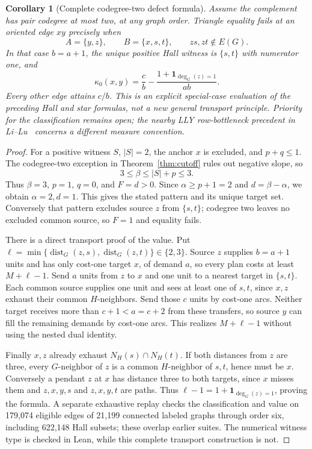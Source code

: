 \documentclass[11pt]{article}
\newtheorem{corollary}[theorem]{Corollary}
\theoremstyle{remark}
\newcommand{\dist}{\operatorname{dist}}
\begin{document}
\begin{corollary}[Complete codegree-two defect formula]\label{cor:k2}
Assume the complement has pair codegree at most two, at any graph order. Triangle equality fails at an oriented edge $xy$ precisely when
\[
 A=\{y,z\},\qquad B=\{x,s,t\},\qquad zs,zt\notin E(G).
\]
In that case $b=a+1$, the unique positive Hall witness is $\{s,t\}$ with numerator one, and
\[
 \kappa_0(x,y)=\frac cb-\frac{1+\boldsymbol1_{\deg_G(z)=1}}{ab}.
\]
Every other edge attains $c/b$. This is an explicit special-case evaluation of the preceding Hall and star formulas, not a new general transport principle. Priority for the classification remains open; the nearby LLY row-bottleneck precedent in Li--Lu~\cite{lilu} concerns a different measure convention.
\end{corollary}
\begin{proof}
For a positive witness $S$, $|S|=2$, the anchor $x$ is excluded, and $p+q\le1$. The codegree-two exception in Theorem~\ref{thm:cutoff} rules out negative slope, so
\[
 3\le\beta\le |S|+p\le3.
\]
Thus $\beta=3$, $p=1$, $q=0$, and $F=d>0$. Since $\alpha\ge p+1=2$ and $d=\beta-\alpha$, we obtain $\alpha=2,d=1$. This gives the stated pattern and its unique target set. Conversely that pattern excludes source $z$ from $\{s,t\}$; codegree two leaves no excluded common source, so $F=1$ and equality fails.

There is a direct transport proof of the value. Put $\ell=\min\{\dist_G(z,s),\dist_G(z,t)\}\in\{2,3\}$. Source $z$ supplies $b=a+1$ units and has only cost-one target $x$, of demand $a$, so every plan costs at least $M+\ell-1$. Send $a$ units from $z$ to $x$ and one unit to a nearest target in $\{s,t\}$. Each common source supplies one unit and sees at least one of $s,t$, since $x,z$ exhaust their common $H$-neighbors. Send those $c$ units by cost-one arcs. Neither target receives more than $c+1<a=c+2$ from these transfers, so source $y$ can fill the remaining demands by cost-one arcs. This realizes $M+\ell-1$ without using the nested dual identity.

Finally $x,z$ already exhaust $N_H(s)\cap N_H(t)$. If both distances from $z$ are three, every $G$-neighbor of $z$ is a common $H$-neighbor of $s,t$, hence must be $x$. Conversely a pendant $z$ at $x$ has distance three to both targets, since $x$ misses them and $z,x,y,s$ and $z,x,y,t$ are paths. Thus $\ell-1=1+\boldsymbol1_{\deg_G(z)=1}$, proving the formula. A separate exhaustive replay checks the classification and value on 179,074 eligible edges of 21,199 connected labeled graphs through order six, including 622,148 Hall subsets; these overlap earlier suites. The numerical witness type is checked in Lean, while this complete transport construction is not.
\end{proof}
\end{document}

